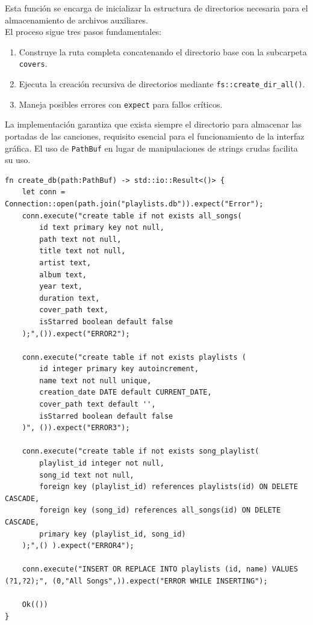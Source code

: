 \documentclass[11pt, a4paper]{article}
\begin{document}
            Esta función se encarga de inicializar la estructura de directorios necesaria para el almacenamiento de archivos auxiliares. \\

            El proceso sigue tres pasos fundamentales:

            \begin{enumerate}
              \item Construye la ruta completa concatenando el directorio base con la subcarpeta \verb|covers|.
              \item Ejecuta la creación recursiva de directorios mediante \verb|fs::create_dir_all()|.
              \item Maneja posibles errores con \verb|expect| para fallos críticos.
            \end{enumerate}

            La implementación garantiza que exista siempre el directorio para almacenar las portadas de las canciones, requisito esencial para el funcionamiento de la interfaz gráfica. El uso de \verb|PathBuf| en lugar de manipulaciones de strings crudas facilita su uso.

            \begin{lstlisting}[caption={fn create\_db()}]
fn create_db(path:PathBuf) -> std::io::Result<()> {
    let conn = Connection::open(path.join("playlists.db")).expect("Error");
    conn.execute("create table if not exists all_songs(
        id text primary key not null,
        path text not null,
        title text not null,
        artist text,
        album text,
        year text,
        duration text,
        cover_path text,
        isStarred boolean default false
    );",()).expect("ERROR2");

    conn.execute("create table if not exists playlists (
        id integer primary key autoincrement,
        name text not null unique,
        creation_date DATE default CURRENT_DATE,
        cover_path text default '',
        isStarred boolean default false
    )", ()).expect("ERROR3");

    conn.execute("create table if not exists song_playlist(
        playlist_id integer not null,
        song_id text not null,
        foreign key (playlist_id) references playlists(id) ON DELETE CASCADE,
        foreign key (song_id) references all_songs(id) ON DELETE CASCADE,
        primary key (playlist_id, song_id)
    );",() ).expect("ERROR4");

    conn.execute("INSERT OR REPLACE INTO playlists (id, name) VALUES (?1,?2);", (0,"All Songs",)).expect("ERROR WHILE INSERTING");

    Ok(())
}
            \end{lstlisting}
\end{document}
